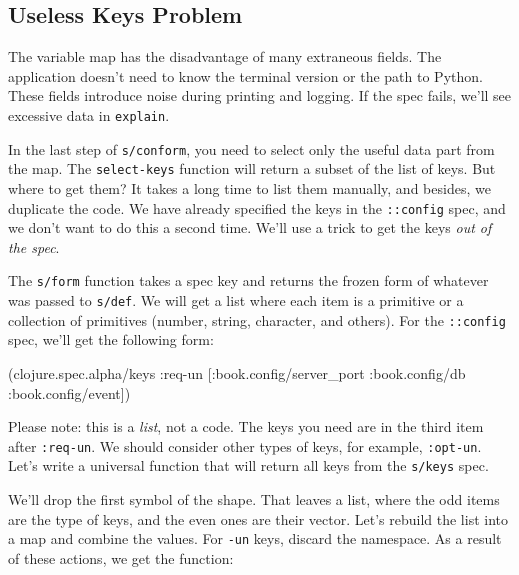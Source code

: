 \subsection{Useless Keys Problem}

The variable map has the disadvantage of many extraneous fields. The application doesn't need to know the terminal version or the path to Python. These fields introduce noise during printing and logging. If the spec fails, we'll see excessive data in \verb|explain|.


In the last step of \verb|s/conform|, you need to select only the useful data part from the map. The \verb|select-keys| function will return a subset of the list of keys. But where to get them? It takes a long time to list them manually, and besides, we duplicate the code. We have already specified the keys in the \verb|::config| spec, and we don't want to do this a second time. We'll use a trick to get the keys \emph{out of the spec}.

The \verb|s/form| function takes a spec key and returns the frozen form of whatever was passed to \verb|s/def|. We will get a list where each item is a primitive or a collection of primitives (number, string, character, and others).
For the \verb|::config| spec, we'll get the following form:

\begin{english}
  \begin{clojure}
(clojure.spec.alpha/keys
 :req-un [:book.config/server_port
          :book.config/db
          :book.config/event])
  \end{clojure}
\end{english}


Please note: this is a \emph{list}, not a code. The keys you need are in the third item after \verb|:req-un|. We should consider other types of keys, for example, \verb|:opt-un|. Let's write a universal function that will return all keys from the \verb|s/keys| spec.

We'll drop the first symbol of the shape.  That leaves a list, where the odd items are the type of keys, and the even ones are their vector. Let's rebuild the list into a map and combine the values. For \verb|-un| keys, discard the namespace. As a result of these actions, we get the function:



